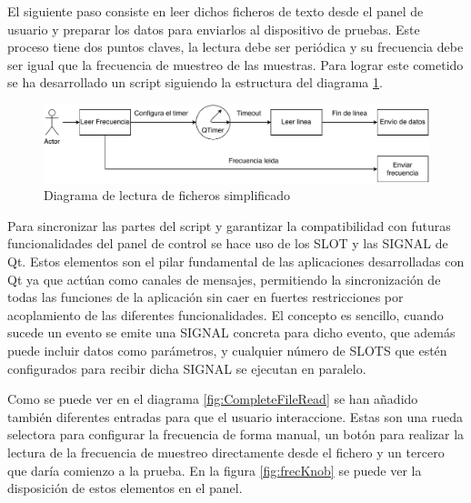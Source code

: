         El siguiente paso consiste en leer dichos ficheros de texto desde el panel de usuario y preparar los datos para enviarlos al dispositivo de pruebas. Este proceso tiene dos puntos claves, la lectura debe ser periódica y su frecuencia debe ser igual que la frecuencia de muestreo de las muestras. Para lograr este cometido se ha desarrollado un script siguiendo la estructura del diagrama \ref{fig:SimpleFileRead}. 

        \begin{figure}[H]  
                \centering
                        \includegraphics[width =\linewidth]{figuras/SimpleFileRead.pdf}
                \caption{Diagrama de lectura de ficheros simplificado}
                \label{fig:SimpleFileRead}
        \end{figure}

        Para sincronizar las partes del script y garantizar la compatibilidad con futuras funcionalidades del panel de control se hace uso de los SLOT y las SIGNAL de Qt. Estos elementos son el pilar fundamental de las aplicaciones desarrolladas con Qt ya que actúan como canales de mensajes, permitiendo la sincronización de todas las funciones de la aplicación sin caer en fuertes restricciones por acoplamiento de las diferentes funcionalidades. El concepto es sencillo, cuando sucede un evento se emite una SIGNAL concreta para dicho evento, que además puede incluir datos como parámetros, y cualquier número de SLOTS que estén configurados para recibir dicha SIGNAL se ejecutan en paralelo. 

        Como se puede ver en el diagrama \ref{fig:CompleteFileRead} se han añadido también diferentes entradas para que el usuario interaccione. Estas son una rueda selectora para configurar la frecuencia de forma manual, un botón para realizar la lectura de la frecuencia de muestreo directamente desde el fichero y un tercero que daría comienzo a la prueba. En la figura \ref{fig:frecKnob} se puede ver la disposición de estos elementos en el panel.

